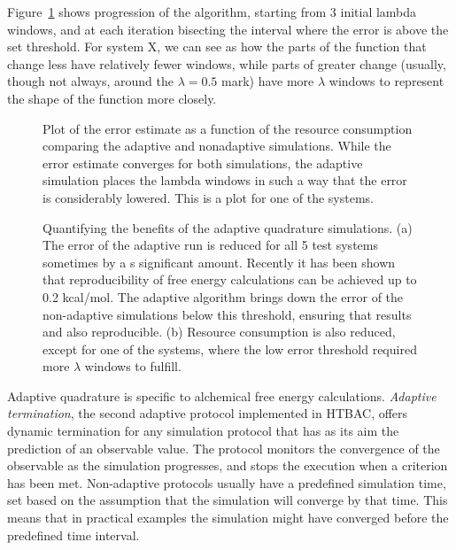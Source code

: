 Figure~\ref{fig:adapconv} shows progression of the algorithm, starting from 3
initial lambda windows, and at each iteration bisecting the interval where
the error is above the set threshold. For system X, we can see as how the
parts of the function that change less have relatively fewer windows, while
parts of greater change (usually, though not always, around the $\lambda=0.5$
mark) have more $\lambda$ windows to represent the shape of the function more
closely.

\begin{figure}
  
  \caption{Plot of the error estimate as a function of the resource
  consumption comparing the adaptive and nonadaptive simulations. While the
  error estimate converges for both simulations, the adaptive simulation
  places the lambda windows in such a way that the error is considerably
  lowered. This is a plot for one of the systems.}
\label{fig:adapconv}
\end{figure}

\begin{figure}
  
  \caption{Quantifying the benefits of the adaptive quadrature simulations.
  (a) The error of the adaptive run is reduced for all 5 test systems
  sometimes by a s significant amount. Recently \cite{} it has been shown
  that reproducibility of free energy calculations can be achieved up to 0.2
  kcal/mol. The adaptive algorithm brings down the error of the non-adaptive
  simulations below this threshold, ensuring that results and also
  reproducible. (b) Resource consumption is also reduced, except for one of
  the systems, where the low error threshold required more $\lambda$ windows
  to fulfill.}
  \label{fig:savings}
\end{figure}

Adaptive quadrature is specific to alchemical free energy calculations.
\emph{Adaptive termination}, the second adaptive protocol implemented in
HTBAC, offers dynamic termination for any simulation protocol that has as its
aim the prediction of an observable value. The protocol monitors the
convergence of the observable as the simulation progresses, and stops the
execution when a criterion has been met. Non-adaptive protocols usually have
a predefined simulation time, set based on the assumption that the simulation
will converge by that time. This means that in practical examples the
simulation might have converged before the predefined time interval.


